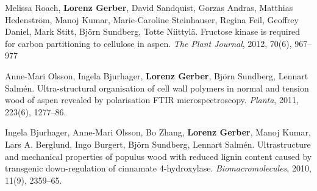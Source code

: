 \documentclass[10pt]{article}
\begin{document}
\begin{bibenum}
                                                                                           \item Melissa Roach, \textbf{Lorenz Gerber}, David Sandquist,
                                                                                             Gorzas Andras, Matthias Hedenstr\"{o}m, Manoj Kumar,
                                                                                             Marie-Caroline Steinhauser, Regina Feil, Geoffrey Daniel,
                                                                                             Mark Stitt, Bj\"{o}rn Sundberg, Totte Niittyl\"{a}.
                                                                                             Fructose kinase is required for carbon partitioning to
                                                                                             cellulose in aspen. \emph{The Plant Journal}, 2012, 70(6), 967--977\\

                                                                                           \item Anne-Mari Olsson, Ingela Bjurhager, \textbf{Lorenz Gerber},
                                                                                             Bj\"{o}rn Sundberg, Lennart Salm\'{e}n. Ultra-structural
                                                                                             organisation of cell wall polymers in normal and tension wood
                                                                                             of aspen revealed by polarisation FTIR microspectroscopy.
                                                                                             \emph{Planta}, 2011, 223(6), 1277--86.\\

                                                                                           \item Ingela Bjurhager, Anne-Mari Olsson, Bo Zhang,
                                                                                             \textbf{Lorenz Gerber}, Manoj Kumar, Lars A. Berglund,
                                                                                             Ingo Burgert, Bj\"{o}rn Sundberg, Lennart Salm\'{e}n.
                                                                                             Ultrastructure and mechanical properties of populus wood with
                                                                                             reduced lignin content caused by transgenic down-regulation of
                                                                                             cinnamate 4-hydroxylase. \emph{Biomacromolecules}, 2010, 11(9), 2359--65.\\


\end{bibenum}
\end{document}
